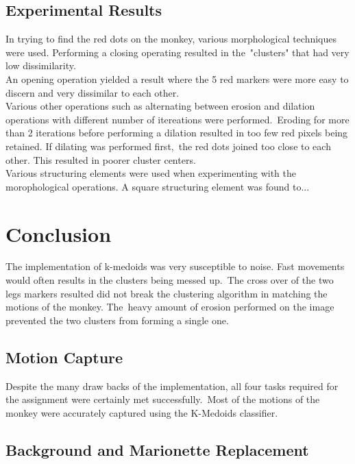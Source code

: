\documentclass[12pt,a4paper]{article}
\begin{document}
      \subsection{Experimental Results}
      In trying to find the red dots on the monkey, various morphological techniques were used. Performing a closing operating resulted in the\
      "clusters" that had very low dissimilarity.
      \\

      An opening operation yielded a result where the 5 red markers were more easy to discern and very dissimilar to each other.
      \\

      Various other operations such as alternating between erosion and dilation operations with different number of itereations were performed.\
      Eroding for more than 2 iterations before performing a dilation resulted in too few red pixels being retained. If dilating was performed first,\
      the red dots joined too close to each other. This resulted in poorer cluster centers.
      \\

      Various structuring elements were used when experimenting with the morophological operations. A square structuring element was found to...

    \section{Conclusion}

    The implementation of k-medoids was very susceptible to noise. Fast movements would often results in the clusters being messed up.\
    The cross over of the two legs markers resulted did not break the clustering algorithm in matching the motions of the monkey. The\
    heavy amount of erosion performed on the image prevented the two clusters from forming a single one.

      \subsection{Motion Capture}

      Despite the many draw backs of the implementation, all four tasks required for the assignment were certainly met successfully.\
      Most of the motions of the monkey were accurately captured using the K-Medoids classifier.

      \subsection{Background and Marionette Replacement}
\end{document}
